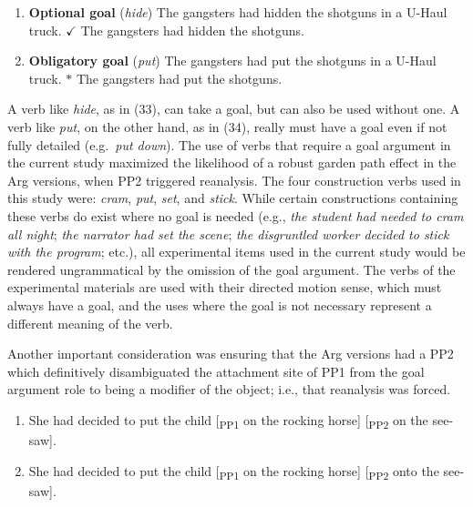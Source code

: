 \documentclass[11pt,oneside]{book}
\providecommand{\tightlist}{%
  \setlength{\itemsep}{0pt}\setlength{\parskip}{0pt}}
\begin{document}
\begin{enumerate}
\def\labelenumi{(\arabic{enumi})}
\setcounter{enumi}{32}
\item
  \textbf{Optional goal} (\emph{hide}) \linebreak\nopagebreak
  The gangsters had hidden the shotguns in a U-Haul truck. \linebreak\nopagebreak
  \(\checkmark\) The gangsters had hidden the shotguns.
\item
  \textbf{Obligatory goal} (\emph{put}) \linebreak\nopagebreak
  The gangsters had put the shotguns in a U-Haul truck. \linebreak\nopagebreak
  \(*\) The gangsters had put the shotguns.
\end{enumerate}

A verb like \emph{hide}, as in (33), can take a goal, but can also be used without one. A verb like \emph{put}, on the other hand, as in (34), really must have a goal even if not fully detailed (e.g.~\emph{put down}). The use of verbs that require a goal argument in the current study maximized the likelihood of a robust garden path effect in the Arg versions, when PP2 triggered reanalysis. The four construction verbs used in this study were: \emph{cram}, \emph{put}, \emph{set}, and \emph{stick}. While certain constructions containing these verbs do exist where no goal is needed (e.g., \emph{the student had needed to cram all night}; \emph{the narrator had set the scene}; \emph{the disgruntled worker decided to stick with the program}; etc.), all experimental items used in the current study would be rendered ungrammatical by the omission of the goal argument. The verbs of the experimental materials are used with their directed motion sense, which must always have a goal, and the uses where the goal is not necessary represent a different meaning of the verb.

Another important consideration was ensuring that the Arg versions had a PP2 which definitively disambiguated the attachment site of PP1 from the goal argument role to being a modifier of the object; i.e., that reanalysis was forced.

\begin{enumerate}
\def\labelenumi{(\arabic{enumi})}
\setcounter{enumi}{34}
\tightlist
\item
  She had decided to put the child {[}\textsubscript{PP1} on the rocking horse{]} {[}\textsubscript{PP2} on the see-saw{]}.
\item
  She had decided to put the child {[}\textsubscript{PP1} on the rocking horse{]} {[}\textsubscript{PP2} onto the see-saw{]}.
\end{enumerate}
\end{document}

